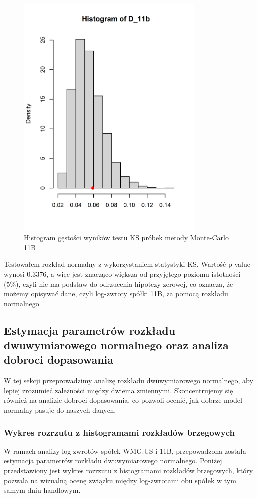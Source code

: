 \documentclass[a4paper,11pt]{article}
\begin{document}
\begin{figure}[h]
\centering
\includegraphics[width=9cm, height=12cm]{img/diff_11b_hipoteza_o_rownosci.png}
\caption{Histogram gęstości wyników testu KS próbek metody Monte-Carlo 11B}
\end{figure}

Testowałem rozkład normalny z wykorzystaniem statystyki KS. Wartość p-value wynosi 0.3376, a więc jest znacząco większa od przyjętego poziomu istotności (5\%), czyli nie ma podstaw do odrzucenia hipotezy zerowej, co oznacza, że możemy opisywać dane, czyli log-zwroty spółki 11B, za pomocą rozkładu normalnego

\newpage
\subsection{Estymacja parametrów rozkładu dwuwymiarowego normalnego oraz analiza
dobroci dopasowania}
W tej sekcji przeprowadzimy analizę rozkładu dwuwymiarowego normalnego, aby lepiej zrozumieć zależności między dwiema zmiennymi. Skoncentrujemy się również na analizie dobroci dopasowania, co pozwoli ocenić, jak dobrze model normalny pasuje do naszych danych.
\subsubsection{Wykres rozrzutu z histogramami rozkładów brzegowych}
W ramach analizy log-zwrotów spółek WMG.US i 11B, przepowadzona została estymacja parametrów rozkładu dwuwymiarowego normalnego. Poniżej przedstawiony jest wykres rozrzutu z histogramami rozkładów brzegowych, który pozwala na wizualną ocenę związku między log-zwrotami obu spółek w tym samym dniu handlowym.
\end{document}
